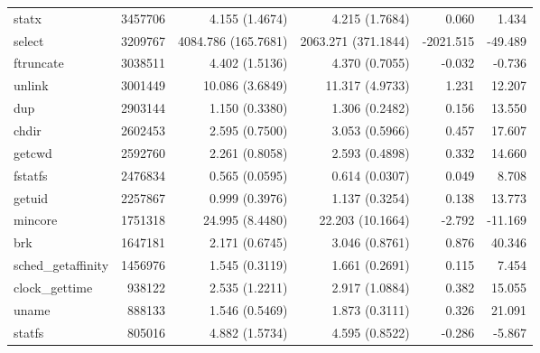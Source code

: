 \begin{longtable}{>{\ttfamily}lrrrrr}
                          statx &     3457706 &           4.155 (1.4674) &           4.215 (1.7684) &           0.060 &        1.434 \\
                         select &     3209767 &      4084.786 (165.7681) &      2063.271 (371.1844) &       -2021.515 &      -49.489 \\
                      ftruncate &     3038511 &           4.402 (1.5136) &           4.370 (0.7055) &          -0.032 &       -0.736 \\
                         unlink &     3001449 &          10.086 (3.6849) &          11.317 (4.9733) &           1.231 &       12.207 \\
                            dup &     2903144 &           1.150 (0.3380) &           1.306 (0.2482) &           0.156 &       13.550 \\
                          chdir &     2602453 &           2.595 (0.7500) &           3.053 (0.5966) &           0.457 &       17.607 \\
                         getcwd &     2592760 &           2.261 (0.8058) &           2.593 (0.4898) &           0.332 &       14.660 \\
                        fstatfs &     2476834 &           0.565 (0.0595) &           0.614 (0.0307) &           0.049 &        8.708 \\
                         getuid &     2257867 &           0.999 (0.3976) &           1.137 (0.3254) &           0.138 &       13.773 \\
                        mincore &     1751318 &          24.995 (8.4480) &         22.203 (10.1664) &          -2.792 &      -11.169 \\
                            brk &     1647181 &           2.171 (0.6745) &           3.046 (0.8761) &           0.876 &       40.346 \\
             sched\_getaffinity &     1456976 &           1.545 (0.3119) &           1.661 (0.2691) &           0.115 &        7.454 \\
                 clock\_gettime &      938122 &           2.535 (1.2211) &           2.917 (1.0884) &           0.382 &       15.055 \\
                          uname &      888133 &           1.546 (0.5469) &           1.873 (0.3111) &           0.326 &       21.091 \\
                         statfs &      805016 &           4.882 (1.5734) &           4.595 (0.8522) &          -0.286 &       -5.867 \\

\end{longtable}
